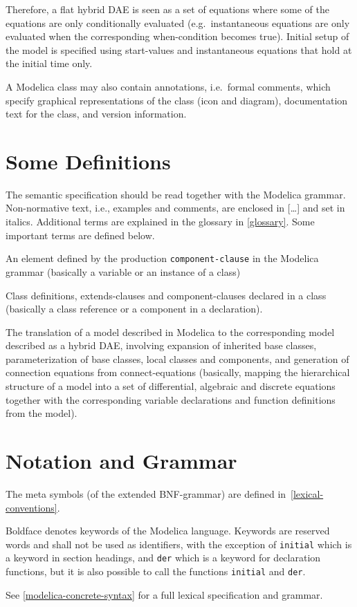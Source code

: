 Therefore, a flat hybrid DAE is seen as a set of equations where some of
the equations are only conditionally evaluated (e.g.\ instantaneous
equations are only evaluated when the corresponding when-condition
becomes true). Initial setup of the model is specified using
start-values and instantaneous equations that hold at the initial time
only.

A Modelica class may also contain annotations, i.e.\ formal comments,
which specify graphical representations of the class (icon and diagram),
documentation text for the class, and version information.

\section{Some Definitions}\label{some-definitions}

The semantic specification should be read together with the Modelica grammar.  Non-normative text, i.e., examples and comments, are enclosed in {[}\ldots{]} and set in italics.  Additional terms
are explained in the glossary in \cref{glossary}.  Some important terms are defined below.

\begin{definition}[Component]
An element defined by the production \lstinline!component-clause! in the Modelica grammar (basically a variable or an instance of a class)
\end{definition}

\begin{definition}[Element]
Class definitions, extends-clauses and component-clauses declared in a class (basically a class reference or a component in a declaration).
\end{definition}

\begin{definition}[Flattening]
The translation of a model described in Modelica to the corresponding model described as a hybrid DAE, involving expansion of inherited base classes, parameterization of base classes, local classes
and components, and generation of connection equations from connect-equations (basically, mapping the hierarchical structure of a model into a set of differential, algebraic and discrete equations
together with the corresponding variable declarations and function definitions from the model).
\end{definition}

\section{Notation and Grammar}\label{notation-and-grammar}

The meta symbols (of the extended BNF-grammar) are defined in~\cref{lexical-conventions}.

Boldface denotes keywords of the Modelica language. Keywords are
reserved words and shall not be used as identifiers, with the exception of
\lstinline!initial! which is a keyword in section headings, and \lstinline!der! which is a
keyword for declaration functions, but it is also possible to call the
functions \lstinline!initial! and \lstinline!der!.

See \cref{modelica-concrete-syntax} for a full lexical specification and grammar.
